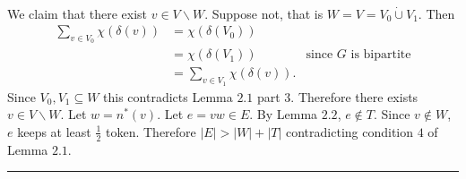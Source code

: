 \documentclass[letterpaper,12pt,oneside,onecolumn]{article}
\newenvironment{proof}{{\bf Proof:  }}{\hfill\rule{2mm}{2mm}}
\begin{document}
\begin{proof}
\paragraph{}
We claim that there exist $v \in V\backslash W$. Suppose not, that is $W = V = V_0 \dot\cup V_1$. Then
\begin{align*}
\sum_{v \in V_0} \chi(\delta(v)) &= \chi(\delta(V_0)) \\
&= \chi(\delta(V_1)) &\text{since $G$ is bipartite} \\
&= \sum_{v \in V_1} \chi(\delta(v)).
\end{align*}
Since $V_0, V_1 \subseteq W$ this contradicts Lemma $2.1$ part $3$. Therefore there exists $v \in V \backslash W$. Let $w = n^*(v)$. Let $e = vw \in E$. By Lemma $2.2$, $e \not \in T$. Since $v \not\in W$, $e$ keeps at least $\frac{1}{2}$ token. Therefore $|E| > |W| + |T|$ contradicting condition $4$ of Lemma $2.1$. 
\end{proof}
\end{document}
